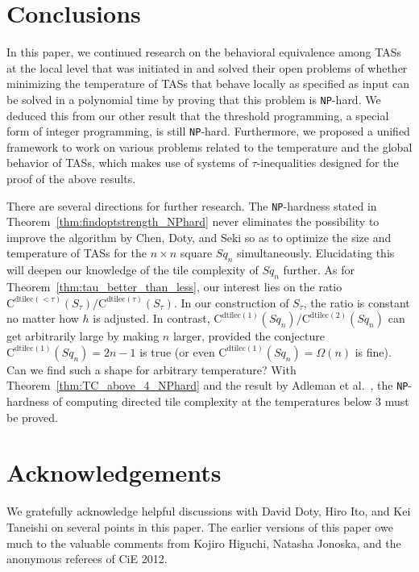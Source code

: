 \documentclass{article}
\theoremstyle{remark}
\theoremstyle{definition}
\newcommand{\dtilec}[1]{\ensuremath{\mathrm{C}^{\mathrm{dtilec}(#1)}}}
\newcommand{\NP}{{\tt NP}}
\renewcommand{\square}[1]{\ensuremath{\mathit{Sq}_{#1}}}
\begin{document}
	\section{Conclusions}

In this paper, we continued research on the behavioral equivalence among TASs at the local level that was initiated in \cite{ChenDotySeki2011} and solved their open problems of whether minimizing the temperature of TASs that behave locally as specified as input can be solved in a polynomial time by proving that this problem is \NP-hard. 
We deduced this from our other result that the threshold programming, a special form of integer programming, is still \NP-hard. 
Furthermore, we proposed a unified framework to work on various problems related to the temperature and the global behavior of TASs, which makes use of systems of $\tau$-inequalities designed for the proof of the above results. 

There are several directions for further research. 
The \NP-hardness stated in Theorem~\ref{thm:findoptstrength_NPhard} never eliminates the possibility to improve the algorithm by Chen, Doty, and Seki so as to optimize the size and temperature of TASs for the $n \times n$ square $\square{n}$ simultaneously.  
Elucidating this will deepen our knowledge of the tile complexity of $\square{n}$ further. 
As for Theorem~\ref{thm:tau_better_than_less}, our interest lies on the ratio $\dtilec{< \tau}(S_\tau)/\dtilec{\tau}(S_\tau)$. 
In our construction of $S_\tau$, the ratio is constant no matter how $h$ is adjusted. 
In contrast, $\dtilec{1}(\square{n})/\dtilec{2}(\square{n})$ can get arbitrarily large by making $n$ larger, provided the conjecture $\dtilec{1}(\square{n}) = 2n-1$ is true (or even $\dtilec{1}(\square{n}) = \Omega(n)$ is fine). 
Can we find such a shape for arbitrary temperature? 
With Theorem~\ref{thm:TC_above_4_NPhard} and the result by Adleman et al.~\cite{AdChGoHuKeEsRo2002}, the \NP-hardness of computing directed tile complexity at the temperatures below 3 must be proved. 


	\section*{Acknowledgements}

We gratefully acknowledge helpful discussions with David Doty, Hiro Ito, and Kei Taneishi on several points in this paper. 
The earlier versions of this paper owe much to the valuable comments from Kojiro Higuchi, Natasha Jonoska, and the anonymous referees of CiE 2012. 
\end{document}
